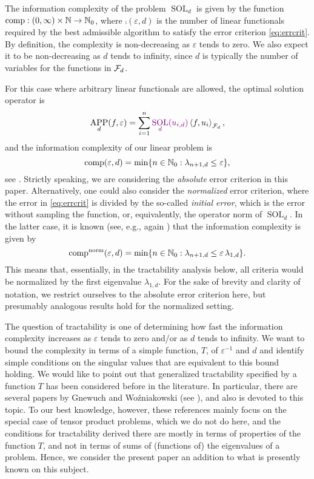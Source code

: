 \documentclass[sort&compress]{elsarticle}
\DeclareMathOperator{\SOL}{SOL}
\DeclareMathOperator{\APP}{APP}
\newcommand{\peter}[1]{\begingroup\color{violet}#1\endgroup}
\begin{document}
The information complexity of the problem $\SOL_d$ is given by the function $\operatorname{comp}:(0,\infty) \times \mathbb{N} \to \mathbb{N}_{0}$, where $\comp(\varepsilon,d)$ is the number of linear functionals required by the best \peter{admissible} algorithm to satisfy the error criterion \eqref{eq:errcrit}.
By definition, the complexity is non-decreasing  as $\varepsilon$ tends to zero.  We also expect it to be non-decreasing as $d$ tends to infinity, since $d$ is typically the number of variables for the functions in $\mathcal{F}_d$.

For this case where arbitrary linear functionals are allowed, the optimal solution operator is
\[
\APP_d(f,\varepsilon) = \sum_{i=1}^n \peter{\SOL_d(u_{i,d})} \ip[\cf_d]{f}{u_i},
\]
and the information complexity of our linear problem is
\begin{equation}\label{eq:comp_def}
\operatorname{comp}(\varepsilon, d) = \min \{n \in \mathbb{N}_{0} : \lambda_{n+1, d} \le \varepsilon\},
\end{equation}
\peter{see \cite{NovWoz08a}.}
\peter{
Strictly speaking, we are considering the \textit{absolute} error criterion in this paper. 
Alternatively, one could also consider the \textit{normalized} error criterion, where the error in \eqref{eq:errcrit} is divided by the so-called \textit{initial error}, which is the error without sampling the function, or, equivalently, the operator norm of $\SOL_d$. In the latter case, it is known (see, e.g., again \cite{NovWoz08a}) that the information complexity is given by 
\[
\operatorname{comp}^{\rm norm}(\varepsilon, d) = \min \{n \in \mathbb{N}_{0} : \lambda_{n+1, d} \le \varepsilon\, \lambda_{1, d}\}.
\]
This means that, essentially, in the tractability analysis below, all criteria would be normalized by the first eigenvalue $\lambda_{1,d}$. For the sake of brevity and clarity of notation, we restrict ourselves to the absolute error criterion here, but presumably analogous results hold for the normalized setting. 
}

The question of tractability is one of determining how fast the \peter{information} complexity increases as $\varepsilon$ tends to zero and/or as $d$ tends to infinity.  We want to bound the complexity in terms of a simple function, $T$, of $\varepsilon^{-1}$ and $d$ and identify simple conditions on the singular values that are equivalent to this bound holding. \peter{We would like to point out that generalized tractability specified by a function $T$ has been considered before in the literature. In particular, there are several papers by Gnewuch and Wo\'{z}niakowski (see \cite{GW06,GW08,GW09,GneWoz11a} ), and also \cite[Chapter 8]{NovWoz08a} is devoted to this topic. To our best knowledge, however, these references mainly focus on the special case of tensor product problems, which we do not do here, and the conditions for tractability derived there are mostly in terms of properties of the function $T$, and not in terms of sums of (functions of) the eigenvalues of a problem. Hence, we consider the present paper an addition to what is presently known on this subject.}
\end{document}
